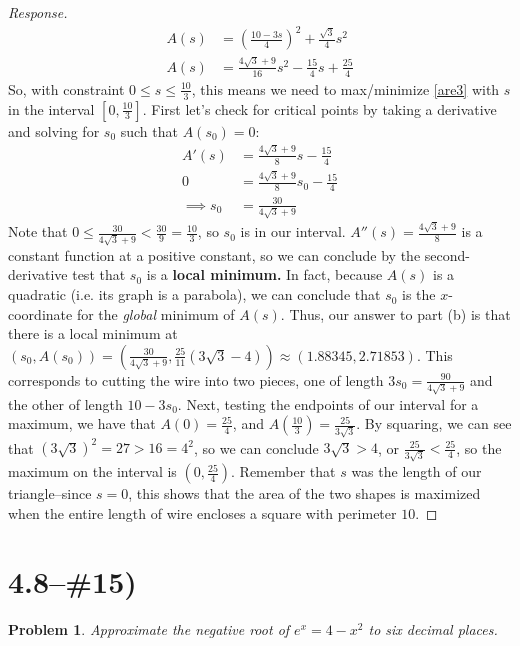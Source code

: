 \documentclass[english]{article}
\newtheorem*{problem*}{Problem}
\theoremstyle{remark}
\theoremstyle{definition}
\begin{document}
\begin{proof}[Response]
\begin{align}
	A(s)&=\left(\frac{10-3s}{4}\right)^2+\frac{\sqrt{3}}{4}s^2\\
A(s)	&=\frac{4\sqrt{3}+9 }{16}s^2-\frac{15}{4}s+\frac{25}{4}\label{are3}
\end{align}
So, with constraint $0\leq s\leq \frac{10}{3}$, this means we need to max/minimize \eqref{are3} with $s$ in the interval $[0,\frac{10}{3}]$. First let's check for critical points by taking a derivative and solving for $s_0$ such that $A(s_0)=0$:
\begin{align*}
A'(s)&=\frac{4\sqrt{3}+9}{8}s-\frac{15}{4}\\
0&=\frac{4\sqrt{3} +9}{8}s_0-\frac{15}{4}\\
\implies s_0&= \frac{30}{4\sqrt{3}+9}
\end{align*} 
Note that $0\leq \frac{30}{4\sqrt{3}+9}<\frac{30}{9}=\frac{10}{3}$, so $s_0$ is in our interval. $A''(s)=\frac{4\sqrt{3}+9}{8}$ is a constant function at a positive constant, so we can conclude by the second-derivative test that $s_0$ is a \textbf{local minimum.} In fact, because $A(s)$ is a quadratic (i.e. its graph is a parabola), we can conclude that $s_0$ is the $x$-coordinate for the \emph{global} minimum of $A(s)$. Thus, our answer to part (b) is that there is a local minimum at $(s_0,A(s_0))=\left(\frac{30}{4\sqrt{3}+9},\frac{25}{11} \left(3 \sqrt{3}-4\right)\right)\approx(1.88345,2.71853)$.
This corresponds to cutting the wire into two pieces, one of length $3s_0=\frac{90}{4\sqrt{3}+9}$ and the other of length $10-3s_0$. Next, testing the endpoints of our interval for a maximum, we have that $A(0)=\frac{25}{4}$, and $A(\frac{10}{3})=\frac{25}{3\sqrt{3}}$. By squaring, we can see that $(3\sqrt{3})^2=27>16=4^2$, so we can conclude $3\sqrt{3}>4$, or $\frac{25}{3\sqrt{3}}<\frac{25}{4}$, so the maximum on the interval is $(0,\frac{25}{4})$. Remember that $s$ was the length of our triangle--since $s=0$, this shows that the area of the two shapes is maximized when the entire length of wire encloses a square with perimeter $10$.
\end{proof}	\section*{4.8--\#15) }\begin{problem*}
Approximate the negative root of $e^x=4-x^2$ to six decimal places.
\end{problem*}
\end{document}
